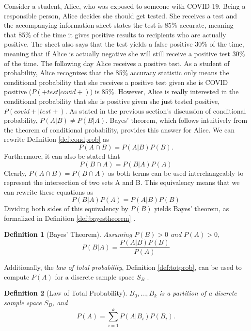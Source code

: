 \documentclass[
  12pt,
]{book}
\theoremstyle{definition}
\newtheorem{definition}{Definition}[chapter]
\theoremstyle{definition}
\theoremstyle{definition}
\theoremstyle{remark}
\begin{document}
Consider a student, Alice, who was exposed to someone with COVID-19.
Being a responsible person, Alice decides she should get tested.
She receives a test and the accompanying information sheet states the test is 85\% accurate, meaning that 85\% of the time it gives positive results to recipients who are actually positive. The sheet also says that the test yields a false positive 30\% of the time, meaning that if Alice is actually negative she will still receive a positive test 30\% of the time.
The following day Alice receives a positive test.
As a student of probability, Alice recognizes that the 85\% accuracy statistic only means the conditional probability that she receives a positive test given she is COVID positive (\(P(+ test|covid+)\)) is 85\%.
However, Alice is really interested in the conditional probability that she is positive given she just tested positive, \(P(covid+|test+)\).
As stated in the previous section's discussion of conditional probability, \(P(A|B) \neq P(B|A)\).
Bayes' theorem, which follows intuitively from the theorem of conditional probability, provides this answer for Alice.
We can rewrite Definition \ref{def:condprob} as
\[P(A \cap B)=P(A|B)P(B).\]
Furthermore, it can also be stated that
\[P(B \cap A)=P(B|A)P(A)\]
Clearly, \(P(A \cap B)=P(B \cap A)\) as both terms can be used interchangeably to represent the intersection of two sets A and B.
This equivalency means that we can rewrite these equations as
\[P(B|A)P(A)=P(A|B)P(B)\]
Dividing both sides of this equivalency by \(P(B)\) yields Bayes' theorem, as formalized in Definition \ref{def:bayestheorem} \citep{Junker2003}.

\begin{definition}[Bayes' Theorem]
\protect\hypertarget{def:bayestheorem}{}{\label{def:bayestheorem} {} }\emph{Assuming \(P(B)>0\) and \(P(A)>0\),}
\[P(B|A)=\frac{P(A|B)P(B)}{P(A)}\]
\end{definition}

Additionally, the \emph{law of total probability}, Definition \ref{def:totprob}, can be used to compute \(P(A)\) for a discrete sample space \(S_{B}\) \citep{Wasserman2004}.

\begin{definition}[Law of Total Probability]
\protect\hypertarget{def:totprob}{}{\label{def:totprob} {} }\emph{\(B_{0},...,B_{k}\) is a partition of a discrete sample space \(S_{B}\), and}
\[P(A)=\sum_{i=1}^{k}P(A|B_{i})P(B_{i}).\]
\end{definition}
\end{document}
